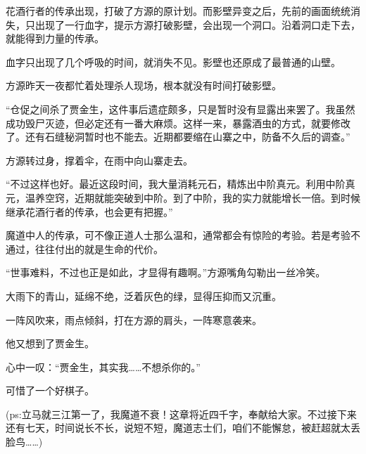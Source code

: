 \begin{this_body}
花酒行者的传承出现，打破了方源的原计划。而影壁异变之后，先前的画面统统消失，只出现了一行血字，提示方源打破影壁，会出现一个洞口。沿着洞口走下去，就能得到力量的传承。

血字只出现了几个呼吸的时间，就消失不见。影壁也还原成了最普通的山壁。

方源昨天一夜都忙着处理杀人现场，根本就没有时间打破影壁。

“仓促之间杀了贾金生，这件事后遗症颇多，只是暂时没有显露出来罢了。我虽然成功毁尸灭迹，但必定还有一番大麻烦。这样一来，暴露酒虫的方式，就要修改了。还有石缝秘洞暂时也不能去。近期都要缩在山寨之中，防备不久后的调查。”

方源转过身，撑着伞，在雨中向山寨走去。

“不过这样也好。最近这段时间，我大量消耗元石，精炼出中阶真元。利用中阶真元，温养空窍，近期就能突破到中阶。到了中阶，我的实力就能增长一倍。到时候继承花酒行者的传承，也会更有把握。”

魔道中人的传承，可不像正道人士那么温和，通常都会有惊险的考验。若是考验不通过，往往付出的就是生命的代价。

“世事难料，不过也正是如此，才显得有趣啊。”方源嘴角勾勒出一丝冷笑。

大雨下的青山，延绵不绝，泛着灰色的绿，显得压抑而又沉重。

一阵风吹来，雨点倾斜，打在方源的肩头，一阵寒意袭来。

他又想到了贾金生。

心中一叹：“贾金生，其实我……不想杀你的。”

可惜了一个好棋子。

(ps:立马就三江第一了，我魔道不衰！这章将近四千字，奉献给大家。不过接下来还有七天，时间说长不长，说短不短，魔道志士们，咱们不能懈怠，被赶超就太丢脸鸟……)

\end{this_body}

